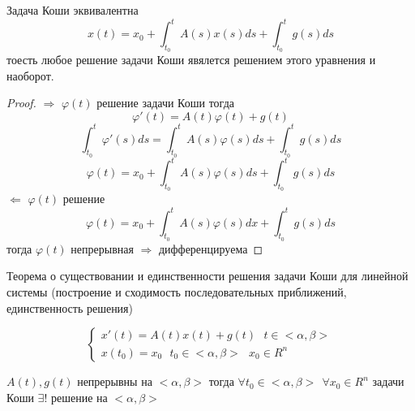\begin{block}
  Задача Коши эквивалентна
  $$
  x(t) = x_0 + \int_{t_0}^t A(s)x(s)ds +
  \int_{t_0}^t g(s)ds
  $$
  тоесть любое решение задачи Коши явялется решением этого уравнения и наоборот.
\end{block}

\begin{proof}
  $\Rightarrow$ $\varphi(t)$ решение задачи Коши тогда
  $$
  \varphi'(t) = A(t)\varphi(t) + g(t)
  $$
  $$
  \int_{t_0}^t \varphi'(s)ds = \int_{t_0}^t A(s) \varphi(s)ds +
  \int_{t_0}^t g(s) ds
  $$
  $$
  \varphi(t) = x_0 + \int_{t_0}^t A(s) \varphi(s) ds  + \int_{t_0}^t g(s)ds
  $$
  $\Leftarrow$ $\varphi(t)$ решение
  $$
  \varphi(t) = x_0 + \int_{t_0}^t A(s)\varphi(s)dx +
  \int_{t_0}^t g(s)ds
  $$
  тогда $\varphi(t)$ непрерывная $\Rightarrow$ дифференцируема
\end{proof}

\begin{title}[\Large]
  Теорема о существовании и единственности решения задачи Коши для линейной
  системы (построение и сходимость последовательных приближений,
  единственность решения)
\end{title}

\begin{define}
  $$
  \left\{
  \begin{array}{l}
    x'(t) = A(t)x(t) + g(t) ~~~ t \in <\alpha, \beta> \\
    x(t_0) = x_0 ~~~ t_0 \in <\alpha, \beta> ~~~ x_0 \in R^n
  \end{array}
  \right.
  $$
\end{define}

\begin{theorem}
  $A(t), g(t)$ непрерывны на $<\alpha, \beta>$ тогда
  $\forall t_0 \in <\alpha, \beta> ~~ \forall x_0 \in R^n$ задачи Коши
  $\exists !$ решение на $<\alpha, \beta>$
\end{theorem}

